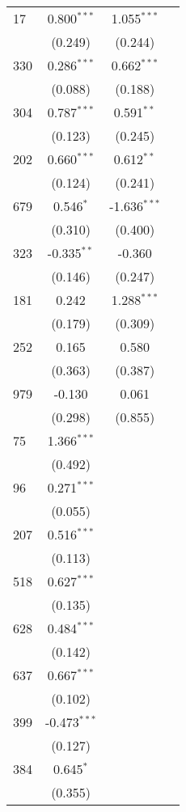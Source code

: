 \begin{center}
\begin{longtable}{lccc}
    17  & 0.800$^{\ast\ast\ast}$ & 1.055$^{\ast\ast\ast}$ &  \\
    & (0.249) & (0.244) &  \\
    330 & 0.286$^{\ast\ast\ast}$ & 0.662$^{\ast\ast\ast}$ &  \\
    & (0.088) & (0.188) &  \\
    304 & 0.787$^{\ast\ast\ast}$ & 0.591$^{\ast\ast}$ &  \\
    & (0.123) & (0.245) &  \\
    202 & 0.660$^{\ast\ast\ast}$ & 0.612$^{\ast\ast}$ &  \\
    & (0.124) & (0.241) &  \\
    679 & 0.546$^{\ast}$ & -1.636$^{\ast\ast\ast}$ &  \\
    & (0.310) & (0.400) &  \\
    323 & -0.335$^{\ast\ast}$ & -0.360 &  \\
    & (0.146) & (0.247) &  \\
    181 & 0.242 & 1.288$^{\ast\ast\ast}$ &  \\
    & (0.179) & (0.309) &  \\
    252 & 0.165 & 0.580 &  \\
    & (0.363) & (0.387) &  \\
    979 & -0.130 & 0.061 &  \\
    & (0.298) & (0.855) &  \\
    75  & 1.366$^{\ast\ast\ast}$ &  &  \\
    & (0.492) &  &  \\
    96  & 0.271$^{\ast\ast\ast}$ &  &  \\
    & (0.055) &  &  \\
    207 & 0.516$^{\ast\ast\ast}$ &  &  \\
    & (0.113) &  &  \\
    518 & 0.627$^{\ast\ast\ast}$ &  &  \\
    & (0.135) &  &  \\
    628 & 0.484$^{\ast\ast\ast}$ &  &  \\
    & (0.142) &  &  \\
    637 & 0.667$^{\ast\ast\ast}$ &  &  \\
    & (0.102) &  &  \\
    399 & -0.473$^{\ast\ast\ast}$ &  &  \\
    & (0.127) &  &  \\
    384 & 0.645$^{\ast}$ &  &  \\
    & (0.355) &  &  \\

\end{longtable}
\end{center}
